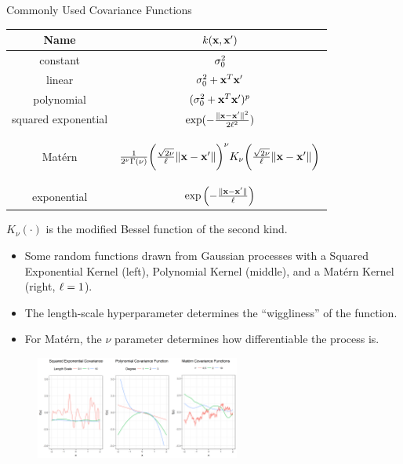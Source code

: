 \begin{frame}[c,allowframebreaks]{Commonly Used Covariance Functions}


\begin{table}[]
\centering
\begin{tabular}{|c|c|}
\hline
Name & $k(\mathbf{x}, \mathbf{x}^\prime)$\\
\hline
constant & $\sigma^2_0$ \\ [1em]
linear & $\sigma^2_0 + \mathbf{x}^T\mathbf{x}^\prime$ \\ [1em]
polynomial & $(\sigma^2_0 + \mathbf{x}^T\mathbf{x}^\prime)^p$ \\ [1em]
squared exponential & $\exp(- \frac{\|\mathbf{x} - \mathbf{x}^\prime\|^2}{2\ell^2})$ \\ [1em]
Matérn & \begin{footnotesize} $\frac{1}{2^\nu \Gamma(\nu)}\biggl(\frac{\sqrt{2 \nu}}{\ell}\|\mathbf{x} - \mathbf{x}^\prime\|\biggr)^{\nu} K_\nu\biggl(\frac{\sqrt{2 \nu}}{\ell}\|\mathbf{x} - \mathbf{x}^\prime\|\biggr)$\end{footnotesize}  \\ [1em]
exponential & $\exp\left(- \frac{\|\mathbf{x} - \mathbf{x}^\prime\|}{\ell}\right)$ \\ [1em]
\hline
\end{tabular}
\end{table}
\begin{footnotesize}
\centering
$K_\nu(\cdot)$ is the modified Bessel function of the second kind.
\end{footnotesize}

\framebreak

\begin{itemize}
\item[\faLightbulbO] Some random functions drawn from Gaussian processes with a Squared Exponential Kernel (left), Polynomial Kernel (middle), and a Matérn Kernel (right, $\ell = 1$). 
\item[\faLightbulbO] The length-scale hyperparameter determines the ``wiggliness'' of the function.
\item[\faLightbulbO] For Matérn, the $\nu$ parameter determines how differentiable the process is.
\end{itemize}

\begin{figure}
\includegraphics[width=0.6\textwidth]{figure_man/covariance.png}
\end{figure}


\end{frame}

